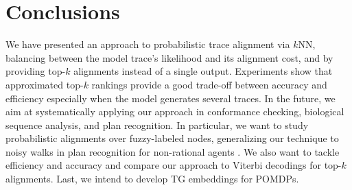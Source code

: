
\section{Conclusions}
\label{sec:conclusion}

We have presented an approach to probabilistic trace alignment via $k$NN, balancing between the model trace's likelihood  and its alignment cost, and by providing top-$k$ 
alignments instead of a single output. Experiments show that approximated top-$k$ rankings provide a good 
trade-off between accuracy and efficiency especially when the model generates several traces.
In the future, we aim at systematically applying  our approach in conformance checking, biological sequence analysis, and plan recognition. In particular,  we want to study  probabilistic alignments over fuzzy-labeled nodes, generalizing our technique to noisy walks in plan recognition for non-rational agents \cite{RamirezG10}. We also want to tackle efficiency and accuracy and compare our approach to %
  Viterbi decodings for top-$k$ alignments. Last, we intend to develop TG embeddings for  POMDPs.
